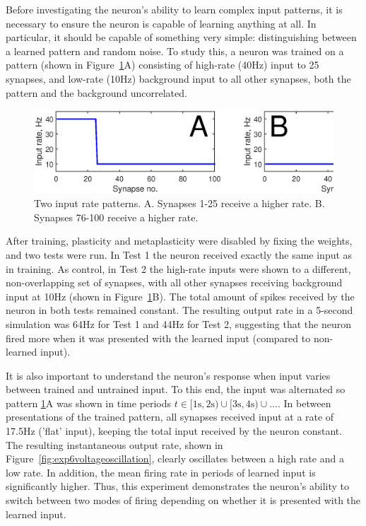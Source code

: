 \documentclass[a4paper,12pt]{report}
\theoremstyle{definition}
\begin{document}

Before investigating the neuron's ability to learn complex input patterns, it is necessary to ensure the neuron is capable of learning anything at all. In particular, it should be capable of something very simple: distinguishing between a learned pattern and random noise. To study this, a neuron was trained on a pattern (shown in Figure~\ref{fig:exp2_inputpatterns}A) consisting of high-rate (40Hz) input to 25 synapses, and low-rate (10Hz) background input to all other synapses, both the pattern and the background uncorrelated.

\begin{figure}[h]
    \centering
    \includegraphics[width=\textwidth]{figures/exp2_inputpatterns.eps}
    \caption{Two input rate patterns. A. Synapses 1-25 receive a higher rate. B. Synapses 76-100 receive a higher rate.}
    \label{fig:exp2_inputpatterns}
\end{figure}

After training, plasticity and metaplasticity were disabled by fixing the weights, and two tests were run. In Test 1 the neuron received exactly the same input as in training. As control, in Test 2 the high-rate inputs were shown to a different, non-overlapping set of synapses, with all other synapses receiving background input at 10Hz (shown in Figure~\ref{fig:exp2_inputpatterns}B). The total amount of spikes received by the neuron in both tests remained constant. The resulting output rate in a 5-second simulation was 64Hz for Test 1 and 44Hz for Test 2, suggesting that the neuron fired more when it was presented with the learned input (compared to non-learned input).


It is also important to understand the neuron's response when input varies between trained and untrained input. To this end, the input was alternated so pattern \ref{fig:exp2_inputpatterns}A was shown in time periods $t \in [1\mathrm{s}, 2\mathrm{s}) \cup [3\mathrm{s}, 4\mathrm{s}) \cup \ldots $. In between presentations of the trained pattern, all synapses received input at a rate of 17.5Hz ('flat' input), keeping the total input received by the neuron constant. The resulting instantaneous output rate, shown in Figure~\ref{fig:exp6voltageoscillation}, clearly oscillates between a high rate and a low rate. In addition, the mean firing rate in periods of learned input is significantly higher. Thus, this experiment demonstrates the neuron's ability to switch between two modes of firing depending on whether it is presented with the learned input.
\end{document}
